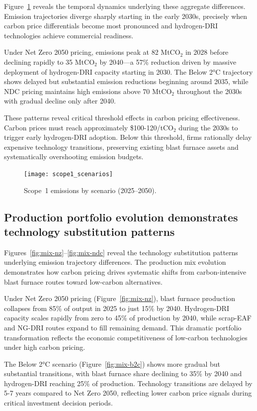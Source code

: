 \documentclass[preprint,5p,authoryear]{elsarticle}
\begin{document}
Figure~\ref{fig:scope1-scenarios} reveals the temporal dynamics underlying these aggregate differences. Emission trajectories diverge sharply starting in the early 2030s, precisely when carbon price differentials become most pronounced and hydrogen-DRI technologies achieve commercial readiness.

Under Net Zero 2050 pricing, emissions peak at 82 MtCO$_2$ in 2028 before declining rapidly to 35 MtCO$_2$ by 2040—a 57\% reduction driven by massive deployment of hydrogen-DRI capacity starting in 2030. The Below 2°C trajectory shows delayed but substantial emission reductions beginning around 2035, while NDC pricing maintains high emissions above 70 MtCO$_2$ throughout the 2030s with gradual decline only after 2040.

These patterns reveal critical threshold effects in carbon pricing effectiveness. Carbon prices must reach approximately \$100-120/tCO$_2$ during the 2030s to trigger early hydrogen-DRI adoption. Below this threshold, firms rationally delay expensive technology transitions, preserving existing blast furnace assets and systematically overshooting emission budgets.

\begin{figure}[!t]
  \centering
  \texttt{[image: scope1\_scenarios]}
  \caption{Scope~1 emissions by scenario (2025--2050).}
  \label{fig:scope1-scenarios}
\end{figure}

\subsection{Production portfolio evolution demonstrates technology substitution patterns}

Figures~\ref{fig:mix-nz}--\ref{fig:mix-ndc} reveal the technology substitution patterns underlying emission trajectory differences. The production mix evolution demonstrates how carbon pricing drives systematic shifts from carbon-intensive blast furnace routes toward low-carbon alternatives.

Under Net Zero 2050 pricing (Figure~\ref{fig:mix-nz}), blast furnace production collapses from 85\% of output in 2025 to just 15\% by 2040. Hydrogen-DRI capacity scales rapidly from zero to 45\% of production by 2040, while scrap-EAF and NG-DRI routes expand to fill remaining demand. This dramatic portfolio transformation reflects the economic competitiveness of low-carbon technologies under high carbon pricing.

The Below 2°C scenario (Figure~\ref{fig:mix-b2c}) shows more gradual but substantial transitions, with blast furnace share declining to 35\% by 2040 and hydrogen-DRI reaching 25\% of production. Technology transitions are delayed by 5-7 years compared to Net Zero 2050, reflecting lower carbon price signals during critical investment decision periods.
\end{document}
